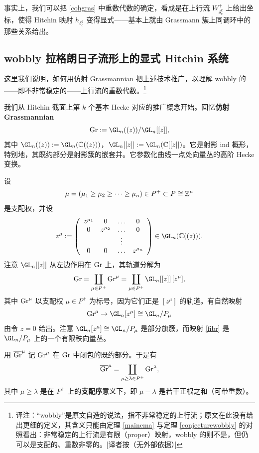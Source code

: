 事实上，我们可以把 \eqref{cohgras} 中重数代数的确定，看成是在上行流 $W^+_{\delta^k_c}$ 上给出坐标，使得 Hitchin 映射 $h_{{\delta^k_c}}$ 变得显式——基本上就由 Grassmann 簇上同调环中的那些关系给出。

\subsection{wobbly 拉格朗日子流形上的显式 Hitchin 系统}

这里我们说明，如何用仿射 Grassmannian \cite{gortz,zhu} 把上述技术推广，以理解 wobbly 的——即不非常稳定的——上行流的重数代数。\footnote{译注：“wobbly”是原文自造的说法，指不非常稳定的上行流；原文在此没有给出更细的定义，其含义只能由定理 \ref{mainema} 与定理 \ref{conjecturewobbly} 的对照看出：非常稳定的上行流是有限（proper）映射，wobbly 的则不是，但仍可以是支配的、重数非零的。[译者按（无外部依据）]}

我们从 Hitchin 截面上第 $k$ 个基本 Hecke 对应的推广概念开始。回忆\textbf{仿射 Grassmannian}
\[
\Gr:=\GL_n((z))/\GL_n[[z]],
\]
其中 $\GL_n((z)):=\GL_n(\C((z)))$，$\GL_n[[z]]:=\GL_n(\C[[z]])$。它是射影 ind 概形，特别地，其既约部分是射影簇的嵌套并。它参数化曲线一点处向量丛的高阶 Hecke 变换。

设
\[
\mu=(\mu_1\geq \mu_2\geq\dots \geq \mu_n)\in P^+\subset P\cong\mathbb{Z}^n
\]
是支配权，并设
\[
z^\mu:=\left(\begin{array}{cccc}z^{\mu_1} &0&\dots&0 \\ 0&z^{\mu_2}&\dots & 0\\ &&\vdots & \\ 0&0&\dots & z^{\mu_n}\end{array}\right)\in \GL_n(\C((z))).
\]
注意 $\GL_n[[z]]$ 从左边作用在 $\textnormal{Gr}$ 上，其轨道分解为
\[
\Gr=\coprod_{\mu\in P^+} \Gr^\mu=\coprod_{\mu\in P^+} \GL_n[[z]]\, [z^\mu],
\]
其中 $\textnormal{Gr}^\mu$ 以支配权 $\mu\in P^+$ 为标号，因为它们正是 $[z^\mu]$ 的轨道。有自然映射
\begin{equation}\label{fibr}
\Gr^\mu\to \GL_n [z^\mu] \cong \GL_n/P_\mu
\end{equation}
由令 $z=0$ 给出。注意 $\GL_n [z^\mu]\cong \GL_n/P_{\mu}$ 是部分旗簇，而映射 \eqref{fibr} 是 $\GL_n/P_{\mu}$ 上的一个有限秩向量丛。

用 $\overline{\textnormal{Gr}}^\mu$ 记 $\textnormal{Gr}^\mu$ 在 $\textnormal{Gr}$ 中闭包的既约部分。于是有
\begin{equation}\label{partition}
\overline{\textnormal{Gr}}^\mu=\coprod_{\mu \geq \lambda\in P^+}\textnormal{Gr}^\lambda,
\end{equation}
其中 $\mu \geq \lambda$ 是在 $P^+$ 上的\textbf{支配序}意义下，即 $\mu-\lambda$ 是若干正根之和（可带重数）。

